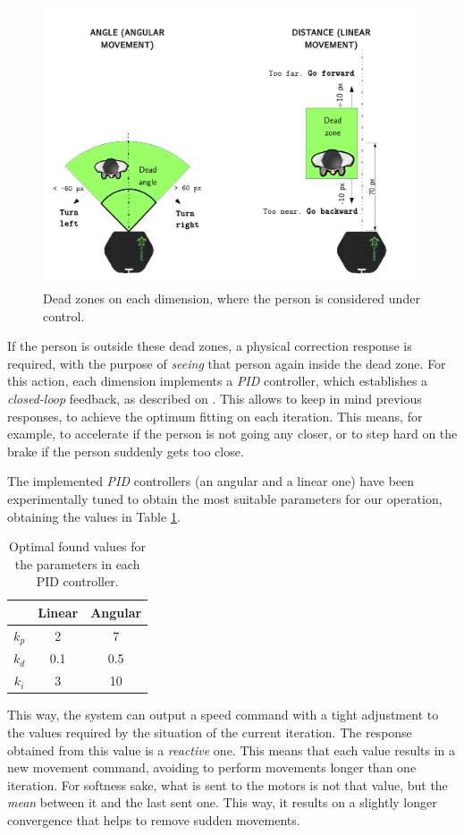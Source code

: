 \begin{figure}[h]
	\centering
	\includegraphics[width=11cm]{images/dead_zones}
	\caption{Dead zones on each dimension, where the person is considered under control.}
	\label{fig:dead_zones}
\end{figure}

If the person is outside these dead zones, a physical correction response is required, with the purpose of \emph{seeing} that person again inside the dead zone. For this action, each dimension implements a \emph{PID} controller, which establishes a \emph{closed-loop} feedback, as described on \cite{pid-controller}. This allows to keep in mind previous responses, to achieve the optimum fitting on each iteration. This means, for example, to accelerate if the person is not going any closer, or to step hard on the brake if the person suddenly gets too close.

The implemented \emph{PID} controllers (an angular and a linear one) have been experimentally tuned to obtain the most suitable parameters for our operation, obtaining the values in Table \ref{tab:pids}.

\begin{table}[h]
	\centering
	\begin{tabular}{|c|c|c|}
		\hline
		\textbf{} & \textbf{Linear} & \textbf{Angular} \\ \hline
		$k_p$     & 2               & 7                \\ \hline
		$k_d$     & 0.1             & 0.5              \\ \hline
		$k_i$     & 3               & 10               \\ \hline
	\end{tabular}
	\caption{Optimal found values for the parameters in each PID controller.}
	\label{tab:pids}
\end{table}

This way, the system can output a speed command with a tight adjustment to the values required by the situation of the current iteration. The response obtained from this value is a \emph{reactive} one. This means that each value results in a new movement command, avoiding to perform movements longer than one iteration. For softness sake, what is sent to the motors is not that value, but the \emph{mean} between it and the last sent one. This way, it results on a slightly longer convergence that helps to remove sudden movements.


